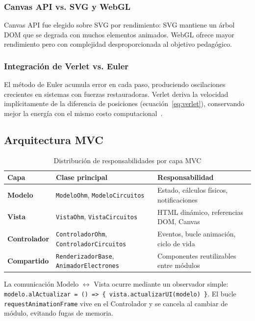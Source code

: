 \documentclass[12pt, a4paper]{article}
\begin{document}
\subsubsection{Canvas API vs. SVG y WebGL}

Canvas API fue elegido sobre SVG por rendimiento: SVG mantiene un árbol
DOM que se degrada con muchos elementos animados. WebGL ofrece mayor
rendimiento pero con complejidad desproporcionada al objetivo pedagógico.

\subsubsection{Integración de Verlet vs. Euler}

El método de Euler acumula error en cada paso, produciendo oscilaciones
crecientes en sistemas con fuerzas restauradoras. Verlet deriva la
velocidad implícitamente de la diferencia de posiciones
(ecuación~\eqref{eq:verlet}), conservando mejor la energía con el mismo
costo computacional~\cite{verlet1967}.

\subsection{Arquitectura MVC}

\begin{table}[H]
\centering\small
\caption{Distribución de responsabilidades por capa MVC}
\begin{tabularx}{\linewidth}{>{\bfseries}llX}
\toprule
Capa & Clase principal & Responsabilidad \\ \midrule
Modelo      & \texttt{ModeloOhm}, \texttt{ModeloCircuitos}  & Estado, cálculos físicos, notificaciones \\
Vista       & \texttt{VistaOhm}, \texttt{VistaCircuitos}    & HTML dinámico, referencias DOM, Canvas \\
Controlador & \texttt{ControladorOhm}, \texttt{ControladorCircuitos} & Eventos, bucle animación, ciclo de vida \\
Compartido  & \texttt{RenderizadorBase}, \texttt{AnimadorElectrones} & Componentes reutilizables entre módulos \\
\bottomrule
\end{tabularx}
\end{table}

La comunicación Modelo $\leftrightarrow$ Vista ocurre mediante un observador
simple: \texttt{modelo.alActualizar = () => \{ vista.actualizarUI(modelo) \}}.
El bucle \texttt{requestAnimationFrame} vive en el Controlador y se cancela al
cambiar de módulo, evitando fugas de memoria.
\end{document}
